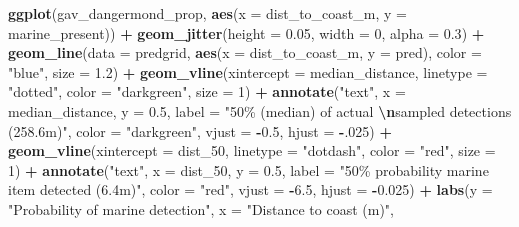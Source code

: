 \documentclass[
]{article}
\newenvironment{Shaded}{\begin{snugshade}}{\end{snugshade}}
\newcommand{\AttributeTok}[1]{\textcolor[rgb]{0.13,0.29,0.53}{#1}}
\newcommand{\DecValTok}[1]{\textcolor[rgb]{0.00,0.00,0.81}{#1}}
\newcommand{\FloatTok}[1]{\textcolor[rgb]{0.00,0.00,0.81}{#1}}
\newcommand{\FunctionTok}[1]{\textcolor[rgb]{0.13,0.29,0.53}{\textbf{#1}}}
\newcommand{\NormalTok}[1]{#1}
\newcommand{\SpecialCharTok}[1]{\textcolor[rgb]{0.81,0.36,0.00}{\textbf{#1}}}
\newcommand{\StringTok}[1]{\textcolor[rgb]{0.31,0.60,0.02}{#1}}
\begin{document}
\begin{Shaded}
\begin{Highlighting}[]
\FunctionTok{ggplot}\NormalTok{(gav\_dangermond\_prop, }\FunctionTok{aes}\NormalTok{(}\AttributeTok{x =}\NormalTok{ dist\_to\_coast\_m, }\AttributeTok{y =}\NormalTok{ marine\_present)) }\SpecialCharTok{+}
  \FunctionTok{geom\_jitter}\NormalTok{(}\AttributeTok{height =} \FloatTok{0.05}\NormalTok{, }\AttributeTok{width =} \DecValTok{0}\NormalTok{, }\AttributeTok{alpha =} \FloatTok{0.3}\NormalTok{) }\SpecialCharTok{+}
  \FunctionTok{geom\_line}\NormalTok{(}\AttributeTok{data =}\NormalTok{ predgrid, }\FunctionTok{aes}\NormalTok{(}\AttributeTok{x =}\NormalTok{ dist\_to\_coast\_m, }\AttributeTok{y =}\NormalTok{ pred),}
            \AttributeTok{color =} \StringTok{"blue"}\NormalTok{, }\AttributeTok{size =} \FloatTok{1.2}\NormalTok{) }\SpecialCharTok{+}
  \FunctionTok{geom\_vline}\NormalTok{(}\AttributeTok{xintercept =}\NormalTok{ median\_distance, }\AttributeTok{linetype =} \StringTok{"dotted"}\NormalTok{, }\AttributeTok{color =} \StringTok{"darkgreen"}\NormalTok{, }\AttributeTok{size =} \DecValTok{1}\NormalTok{) }\SpecialCharTok{+}
  \FunctionTok{annotate}\NormalTok{(}\StringTok{"text"}\NormalTok{, }\AttributeTok{x =}\NormalTok{ median\_distance, }\AttributeTok{y =} \FloatTok{0.5}\NormalTok{, }\AttributeTok{label =} \StringTok{"50\% (median) of actual }\SpecialCharTok{\textbackslash{}n}\StringTok{sampled detections (258.6m)"}\NormalTok{, }\AttributeTok{color =} \StringTok{"darkgreen"}\NormalTok{, }\AttributeTok{vjust =} \SpecialCharTok{{-}}\FloatTok{0.5}\NormalTok{, }\AttributeTok{hjust =} \SpecialCharTok{{-}}\NormalTok{.}\DecValTok{025}\NormalTok{) }\SpecialCharTok{+}
  \FunctionTok{geom\_vline}\NormalTok{(}\AttributeTok{xintercept =}\NormalTok{ dist\_50, }\AttributeTok{linetype =} \StringTok{"dotdash"}\NormalTok{, }\AttributeTok{color =} \StringTok{"red"}\NormalTok{, }\AttributeTok{size =} \DecValTok{1}\NormalTok{) }\SpecialCharTok{+}
  \FunctionTok{annotate}\NormalTok{(}\StringTok{"text"}\NormalTok{, }\AttributeTok{x =}\NormalTok{ dist\_50, }\AttributeTok{y =} \FloatTok{0.5}\NormalTok{, }\AttributeTok{label =} \StringTok{"50\% probability marine item detected (6.4m)"}\NormalTok{, }\AttributeTok{color =} \StringTok{"red"}\NormalTok{, }\AttributeTok{vjust =} \SpecialCharTok{{-}}\FloatTok{6.5}\NormalTok{, }\AttributeTok{hjust =} \SpecialCharTok{{-}}\FloatTok{0.025}\NormalTok{) }\SpecialCharTok{+}
  \FunctionTok{labs}\NormalTok{(}\AttributeTok{y =} \StringTok{"Probability of marine detection"}\NormalTok{,}
       \AttributeTok{x =} \StringTok{"Distance to coast (m)"}\NormalTok{,}

\end{Highlighting}
\end{Shaded}
\end{document}
